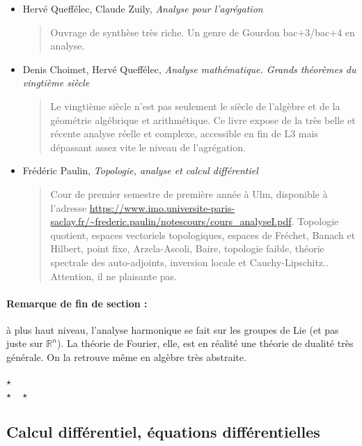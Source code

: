 \documentclass{article}
\def\separateur{\begin{center}
$\star$\\
$\star\quad\star$
\end{center}}
\begin{document}
\begin{itemize}
\item Hervé Queffélec, Claude Zuily, \emph{Analyse pour l'agrégation}
\begin{quote}
Ouvrage de synthèse très riche. Un genre de Gourdon bac+3/bac+4 en analyse.
\end{quote}
\item Denis Choimet, Hervé Queffélec, \emph{Analyse mathématique. Grands théorèmes du vingtième siècle}
\begin{quote}
Le vingtième siècle n'est pas seulement  le siècle de l'algèbre et de la géométrie algébrique et arithmétique. Ce livre expose de la très belle et récente analyse réelle et complexe, accessible en fin de L3 mais dépassant assez vite le niveau de l'agrégation.
\end{quote}
\item Frédéric Paulin, \emph{Topologie, analyse et calcul différentiel}
\begin{quote}
Cour de premier semestre de première année à Ulm, disponible à l'adresse \url{https://www.imo.universite-paris-saclay.fr/~frederic.paulin/notescours/cours_analyseI.pdf}. Topologie quotient, espaces vectoriels topologiques, espaces de Fréchet, Banach et Hilbert, point fixe, Arzela-Ascoli, Baire, topologie faible, théorie spectrale des auto-adjoints, inversion locale et Cauchy-Lipschitz.. Attention, il ne plaisante pas. 
\end{quote}
\end{itemize}

\paragraph{Remarque de fin de section : } à plus haut niveau, l'analyse harmonique se fait sur les groupes de Lie (et pas juste sur $\mathbb R^n$). La théorie de Fourier, elle, est en réalité une théorie de dualité très générale. On la retrouve même en algèbre très abstraite.

\separateur
\newpage
\subsection{Calcul différentiel, équations différentielles}
\end{document}
